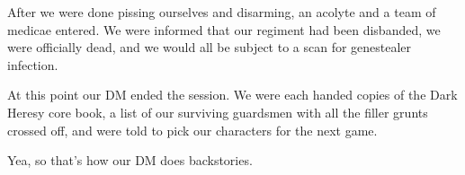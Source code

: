 After we were done pissing ourselves and disarming, an acolyte and a team of medicae entered. 
We were informed that our regiment had been disbanded, we were officially dead, and we would all be subject to a scan for genestealer infection.

At this point our DM ended the session. 
We were each handed copies of the Dark Heresy core book, a list of our surviving guardsmen with all the filler grunts crossed off, and were told to pick our characters for the next game.

Yea, so that's how our DM does backstories.







